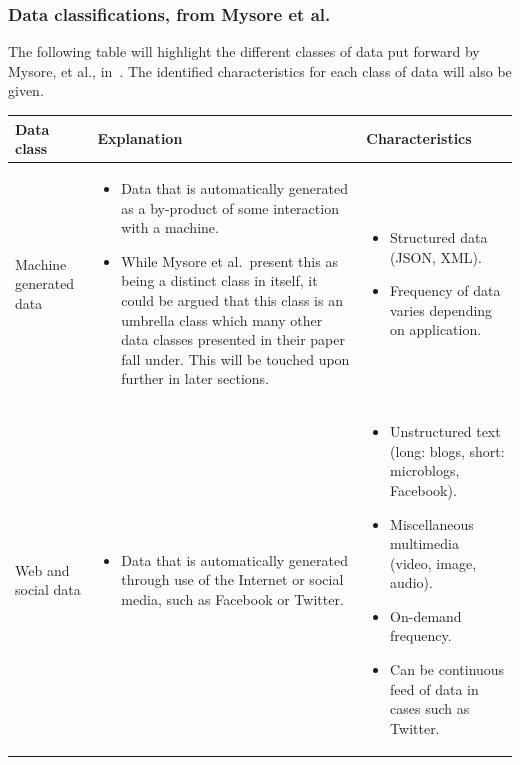 \documentclass[a4paper,11pt]{article}
\begin{document}

 \subsubsection{Data classifications, from Mysore et al.} %
 \label{ssub:data_classification}

The following table will highlight the different classes of data put forward by Mysore, et al., in~\cite{ibm_big_2013}.
The identified characteristics for each class of data will also be given.

\hspace*{-3cm}
\begingroup
\fontsize{8pt}{10pt}\selectfont
\begin{tabular}{ | p{1.5cm} | p{8cm} | p{8cm} | }
  \hline
  \textbf{Data class}          &  \textbf{Explanation} & \textbf{Characteristics}   \\ \hline

  Machine generated data
  &
  \begin{itemize}
    \item Data that is automatically generated as a by-product of some interaction with a machine.
    \item While Mysore et al.\ present this as being a distinct class in itself, it could be argued that this class
    is an umbrella class which many other data classes presented in their paper fall under. This will be touched upon
    further in later sections.
  \end{itemize}
  &
  \begin{itemize}
    \item Structured data (JSON, XML).
    \item Frequency of data varies depending on application.
  \end{itemize}
  \\ \hline

  Web and social data
  &
  \begin{itemize}
    \item Data that is automatically generated through use of the Internet or social media, such as Facebook or Twitter.
  \end{itemize}
  &
  \begin{itemize}
    \item Unstructured text (long: blogs, short: microblogs, Facebook).
    \item Miscellaneous multimedia (video, image, audio).
    \item On-demand frequency.
    \item Can be continuous feed of data in cases such as Twitter.
  \end{itemize}
  \\ \hline


\end{tabular}
\end{document}
